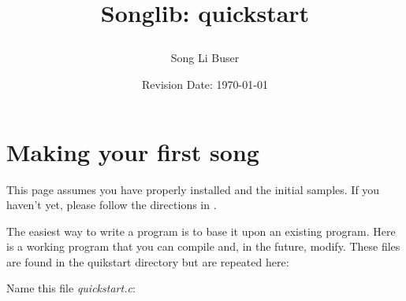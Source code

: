 \documentclass{article}
\title{Songlib: quickstart\\
\date{Revision Date: \today}}
\author{Song Li Buser}
\begin{document}
\maketitle

\W\subsubsection*{}
\W\htmlrule

\section*{Making your first song}

This page assumes you have properly
installed \songlib and the initial samples. 
If you haven't yet,
please follow the directions in .

The easiest way to write a \songlib program is to
base it upon an existing program. Here is
a working program that you can compile and,
in the future, modify.
These files are found in the quikstart directory
but are repeated here:

Name this file {\it quickstart.c}:
\end{document}
